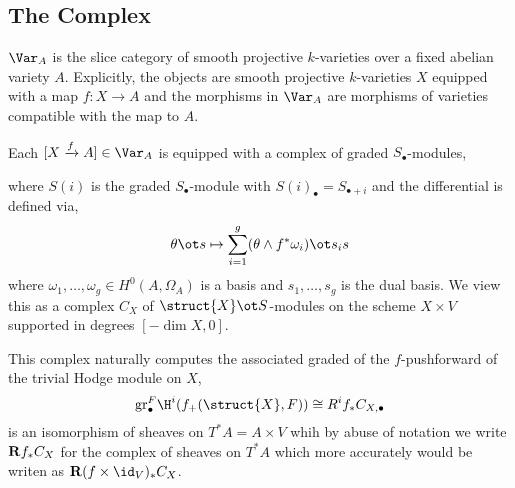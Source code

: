 \documentclass[12pt]{article}
\begin{document}
\newpage

\subsection{The Complex}

\begin{defn}
$\Var_A$ is the slice category of smooth projective $k$-varieties over a fixed abelian variety $A$. Explicitly, the objects are smooth projective $k$-varieties $X$ equipped with a map $f : X \to A$ and the morphisms in $\Var_A$ are morphisms of varieties compatible with the map to $A$.
\end{defn}

Each $[X \xrightarrow{f} A] \in \Var_A$ is equipped with a complex of graded $S_\bullet$-modules,
\begin{center}
\end{center}
where $S(i)$ is the graded $S_\bullet$-module with $S(i)_{\bullet} = S_{\bullet + i}$ and the differential is defined via,
\[ \theta \ot s \mapsto \sum_{i = 1}^g (\theta \wedge f^* \omega_i) \ot s_i s \]
where $\omega_1, \dots, \omega_g \in H^0(A, \Omega_A)$ is a basis and $s_1, \dots, s_g$ is the dual basis. We view this as a complex $C_X$ of $\struct{X} \ot S$-modules on the scheme $X \times V$ supported in degrees $[-\dim{X}, 0]$.

\renewcommand{\gr}{\mathrm{gr}}

\begin{rmk}
This complex naturally computes the associated graded of the $f$-pushforward of the trivial Hodge module on $X$,
\[ \gr^F_\bullet \H^i(f_+(\struct{X}, F)) \cong R^i f_* C_{X, \bullet} \]
is an isomorphism of sheaves on $T^*A = A \times V$ whih by abuse of notation we write $\mathbf{R} f_* C_X$ for the complex of sheaves on $T^* A$ which more accurately would be writen as $\R (f \times \id_V)_* C_X$.
\end{rmk}

\newcommand{\Lbf}{\mathbf{L}}
\end{document}
